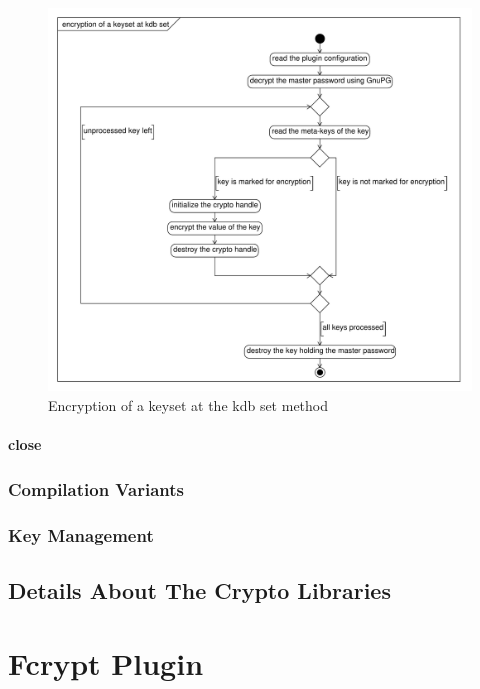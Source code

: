 \begin{figure}[h]
\center
\caption{Encryption of a keyset at the kdb set method}
\label{impl_encrypt}
\includegraphics[width=15.0cm]{umlet-figures/impl_encrypt.pdf}
\end{figure}


\paragraph*{close}


\subsubsection{Compilation Variants}


\subsubsection{Key Management}



\subsection{Details About The Crypto Libraries}\label{details-about-the-crypto-libraries}



\section{Fcrypt Plugin}\label{fcrypt-plugin}

